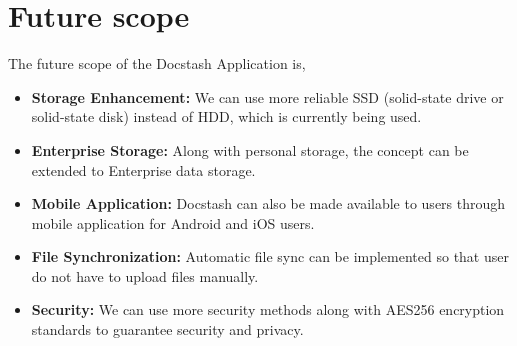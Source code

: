 \chapter{Future scope}
\newpage
The future scope of the Docstash Application is,

\begin{itemize}

\item \textbf{Storage Enhancement: }We can use more reliable SSD (solid-state drive or solid-state disk) instead of HDD, which is currently being used.

\item \textbf{Enterprise Storage: }Along with personal storage, the concept can be extended to Enterprise data storage.

\item \textbf{Mobile Application: }Docstash can also be made available to users through mobile application for Android and iOS users.

\item \textbf{File Synchronization: }Automatic file sync can be implemented so that user do not have to upload files manually.
\item \textbf{Security: }We can use more security methods along with AES256 encryption standards to guarantee security and privacy.

\end{itemize}







